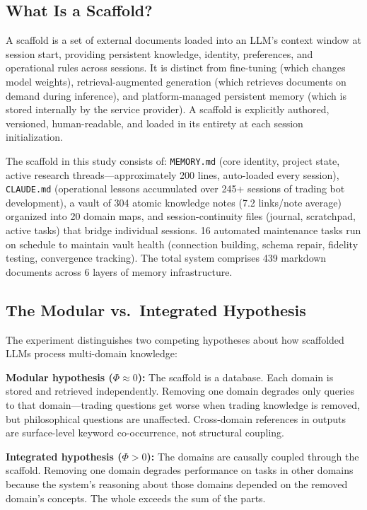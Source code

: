 \documentclass[12pt,letterpaper]{article}
\begin{document}
\subsection{What Is a Scaffold?}

A scaffold is a set of external documents loaded into an LLM's context window at session start, providing persistent knowledge, identity, preferences, and operational rules across sessions. It is distinct from fine-tuning (which changes model weights), retrieval-augmented generation (which retrieves documents on demand during inference), and platform-managed persistent memory (which is stored internally by the service provider). A scaffold is explicitly authored, versioned, human-readable, and loaded in its entirety at each session initialization.

The scaffold in this study consists of: \texttt{MEMORY.md} (core identity, project state, active research threads---approximately 200 lines, auto-loaded every session), \texttt{CLAUDE.md} (operational lessons accumulated over 245+ sessions of trading bot development), a vault of 304 atomic knowledge notes (7.2 links/note average) organized into 20 domain maps, and session-continuity files (journal, scratchpad, active tasks) that bridge individual sessions. 16 automated maintenance tasks run on schedule to maintain vault health (connection building, schema repair, fidelity testing, convergence tracking). The total system comprises 439 markdown documents across 6 layers of memory infrastructure.

\subsection{The Modular vs.\ Integrated Hypothesis}

The experiment distinguishes two competing hypotheses about how scaffolded LLMs process multi-domain knowledge:

\textbf{Modular hypothesis ($\Phi \approx 0$):} The scaffold is a database. Each domain is stored and retrieved independently. Removing one domain degrades only queries to that domain---trading questions get worse when trading knowledge is removed, but philosophical questions are unaffected. Cross-domain references in outputs are surface-level keyword co-occurrence, not structural coupling.

\textbf{Integrated hypothesis ($\Phi > 0$):} The domains are causally coupled through the scaffold. Removing one domain degrades performance on tasks in other domains because the system's reasoning about those domains depended on the removed domain's concepts. The whole exceeds the sum of the parts.
\end{document}
